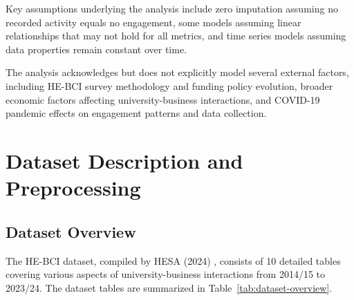 \documentclass[journal,onecolumn, 10pt,draftclsnofoot]{IEEEtran}
\begin{document}
Key assumptions underlying the analysis include zero imputation assuming no recorded activity equals no engagement, some models assuming linear relationships that may not hold for all metrics, and time series models assuming data properties remain constant over time.

The analysis acknowledges but does not explicitly model several external factors, including HE-BCI survey methodology and funding policy evolution, broader economic factors affecting university-business interactions, and COVID-19 pandemic effects on engagement patterns and data collection.

\section{Dataset Description and Preprocessing}
\subsection{Dataset Overview}
The HE-BCI dataset, compiled by HESA (2024) \cite{hesa_he_bci_2024}, consists of 10 detailed tables covering various aspects of university-business interactions from 2014/15 to 2023/24. The dataset tables are summarized in Table~\ref{tab:dataset-overview}.
\end{document}
